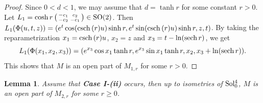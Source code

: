 \documentclass[reqno]{amsart}%
\newtheorem{lemma}[theorem]{Lemma}
\theoremstyle{definition}
\numberwithin{equation}{section}
\begin{document}
\begin{proof}
		Since $0<d<1$, we may assume that $d=\tanh r$ for some constant $r>0$.
		Let $L_1=
		\cosh r \left(\begin{smallmatrix}
			-c_1 & c_2 \\
			-c_2 & -c_1 \\
		\end{smallmatrix}\right)
		\in {\rm SO(2)}$.
		Then $L_1(\Phi(u,t,z))=(e^t\cos ({\rm csch}\, (r) u)\sinh r,
		e^t\sin ({\rm csch}\, (r) u)\sinh r,z,t)$.
		By taking the reparametrization $x_1={\rm csch}\, (r) u$, $x_2=z$
		and $x_3=t-\ln({\rm sech}\, r)$, we get
		$$
		L_1(\Phi(x_1,x_2,x_3))=(e^{x_3}\cos x_1\tanh r,e^{x_3}\sin x_1\tanh r,
		x_2,x_3+\ln({\rm sech}\, r)).
		$$
		This shows that $M$ is an open part of $M_{1,r}$ for some $r>0$.
	\end{proof}
	
	\begin{lemma}\label{lem:4.5}
		Assume that {\bf Case I-(ii)} occurs, then up to isometries of ${\rm Sol_0^4}$,
		$M$ is an open part of $M_{2,r}$ for some $r\geq0$.
	\end{lemma}
	
\end{document}
